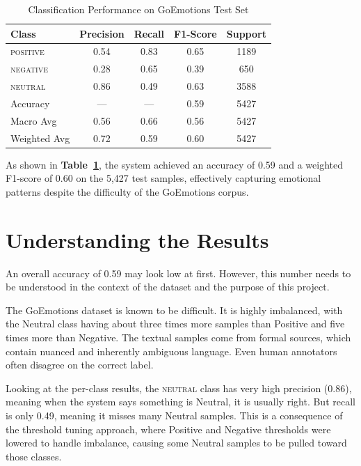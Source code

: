 \begin{table}[H]
\centering
\caption{Classification Performance on GoEmotions Test Set}
\label{tab:classperf}
\begin{tabular}{lcccc}
\toprule
\textbf{Class} & \textbf{Precision} & \textbf{Recall} & \textbf{F1-Score} & \textbf{Support} \\
\midrule
\textsc{positive} & 0.54 & 0.83 & 0.65 & 1189 \\
\textsc{negative} & 0.28 & 0.65 & 0.39 & 650  \\
\textsc{neutral}  & 0.86 & 0.49 & 0.63 & 3588 \\
\midrule
Accuracy          & ---  & ---  & 0.59 & 5427 \\
Macro Avg         & 0.56 & 0.66 & 0.56 & 5427 \\
Weighted Avg      & 0.72 & 0.59 & 0.60 & 5427 \\
\bottomrule
\end{tabular}
\end{table}

As shown in \textbf{Table~\ref{tab:classperf}}, the system achieved an accuracy of 0.59 and a weighted
F1-score of 0.60 on the 5,427 test samples, effectively capturing emotional patterns despite the
difficulty of the GoEmotions corpus.

\section{Understanding the Results}

An overall accuracy of 0.59 may look low at first. However, this number needs to be understood
in the context of the dataset and the purpose of this project.

The GoEmotions dataset is known to be difficult. It is highly imbalanced, with the Neutral class
having about three times more samples than Positive and five times more than Negative. The textual samples come from formal sources, which contain nuanced and inherently ambiguous language. Even
human annotators often disagree on the correct label.

Looking at the per-class results, the \textsc{neutral} class has very high precision (0.86),
meaning when the system says something is Neutral, it is usually right. But recall is only 0.49,
meaning it misses many Neutral samples. This is a consequence of the threshold tuning
approach, where Positive and Negative thresholds were lowered to handle imbalance, causing
some Neutral samples to be pulled toward those classes.


